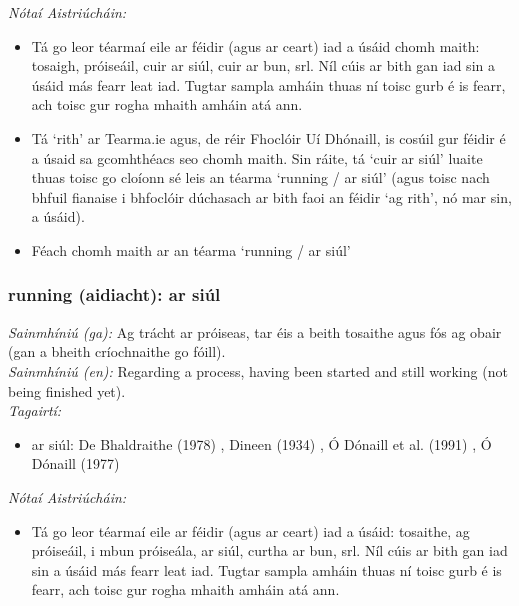  \noindent \textit{Nótaí Aistriúcháin:}
\begin{itemize}
	\item Tá go leor téarmaí eile ar féidir (agus ar ceart) iad a úsáid chomh maith: tosaigh, próiseáil, cuir ar siúl, cuir ar bun, srl. Níl cúis ar bith gan iad sin a úsáid más fearr leat iad. Tugtar sampla amháin thuas ní toisc gurb é is fearr, ach toisc gur rogha mhaith amháin atá ann.
	\item Tá `rith' ar Tearma.ie agus, de réir Fhoclóir Uí Dhónaill, is cosúil gur féidir é a úsaid sa gcomhthéacs seo chomh maith. Sin ráite, tá `cuir ar siúl' luaite thuas toisc go cloíonn sé leis an téarma `running / ar siúl' (agus toisc nach bhfuil fianaise i bhfoclóir dúchasach ar bith faoi an féidir `ag rith', nó mar sin, a úsáid).
	\item Féach chomh maith ar an téarma `running / ar siúl'
\end{itemize}


\subsubsection*{running (aidiacht): ar siúl}
 \noindent \textit{Sainmhíniú (ga):} Ag trácht ar próiseas, tar éis a beith tosaithe agus fós ag obair (gan a bheith críochnaithe go fóill).
\\
 \noindent \textit{Sainmhíniú (en):} Regarding a process, having been started and still working (not being finished yet).
\\
 \noindent \textit{Tagairtí:}
\begin{itemize}
	\item ar siúl: De Bhaldraithe (1978) \cite{de-bhaldraithe}, Dineen (1934) \cite{dineen}, Ó Dónaill et al. (1991) \cite{focloir-beag}, Ó Dónaill (1977) \cite{odonaill}
\end{itemize}

 \noindent \textit{Nótaí Aistriúcháin:}
\begin{itemize}
	\item Tá go leor téarmaí eile ar féidir (agus ar ceart) iad a úsáid: tosaithe, ag próiseáil, i mbun próiseála, ar siúl, curtha ar bun, srl. Níl cúis ar bith gan iad sin a úsáid más fearr leat iad. Tugtar sampla amháin thuas ní toisc gurb é is fearr, ach toisc gur rogha mhaith amháin atá ann.
\end{itemize}



